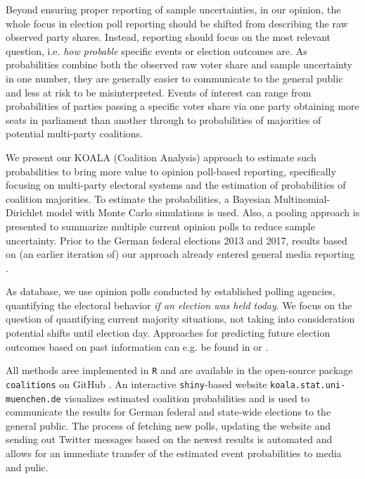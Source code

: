 \documentclass[smallcondensed]{svjour3}     %
\begin{document}

Beyond ensuring proper reporting of sample uncertainties, in our opinion, the
whole focus in election poll reporting should be shifted from describing the raw
observed party shares. Instead, reporting should focus on the most relevant
question, i.e. {\it how probable} specific events or election outcomes are.
As probabilities combine both the observed raw voter share
and sample uncertainty in one number, they are generally easier to
communicate to the general public and less at risk to be misinterpreted.
Events of interest can range from probabilities of parties passing
a specific voter share via one party obtaining more seats in parliament
than another through to probabilities of majorities of potential multi-party coalitions.

We present our KOALA (Coalition Analysis) approach to estimate such probabilities
to bring more value to opinion poll-based reporting, specifically focusing on
multi-party electoral systems and the estimation of probabilities of coalition
majorities. To estimate the probabilities, a Bayesian Multinomial-Dirichlet model
with Monte Carlo simulations is used. Also, a pooling approach is presented to summarize
multiple current opinion polls to reduce sample uncertainty.
Prior to the German federal elections 2013 and 2017, results based on (an earlier iteration of)
our approach already entered general media reporting \citep[cf.][]{wahlistik_2013, gelitz_2017}.

As database, we use opinion polls conducted by established polling agencies,
quantifying the electoral behavior \textit{if an election was held today}.
We focus on the question of quantifying current majority situations, not
taking into consideration potential shifts until election day.
Approaches for predicting future election outcomes based on past
information can e.g. be found in \citet{graefe_2017} or \citet{norpoth_gschwend_2010}.

All methods aree implemented in \texttt{R} \citep{r_2017} and are available in the open-source
package \texttt{coalitions} on GitHub \citep{bender_bauer_2018}. An
interactive \texttt{shiny}-based \citep{chang_2017} website \texttt{koala.stat.uni-\allowbreak muenchen.\allowbreak de}
visualizes estimated coalition probabilities and is used to communicate the results
for German federal and state-wide elections to the general public.
The process of fetching new polls, updating the website and sending out Twitter messages based on the newest results is automated and allows for an immediate transfer of the estimated event probabilities to media and pulic.
\end{document}

